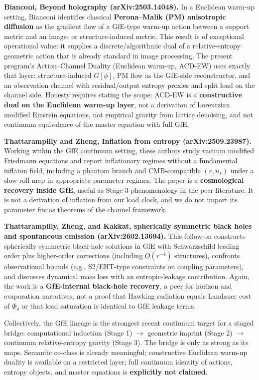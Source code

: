 \documentclass[
  11pt,
]{article}
\begin{document}
\textbf{Bianconi, Beyond holography (arXiv:2503.14048).} In a Euclidean
warm-up setting, Bianconi identifies classical \textbf{Perona--Malik
(PM) anisotropic diffusion} as the gradient flow of a GfE-type warm-up
action between a support metric and an image- or structure-induced
metric. This result is of exceptional operational value: it supplies a
discrete/algorithmic dual of a relative-entropy geometric action that is
already standard in image processing. The present program's
Action--Channel Duality (Euclidean warm-up, ACD-EW) uses exactly that
layer: structure-induced \(G[\phi]\), PM flow as the GfE-side
reconstructor, and an observation channel with residual/output entropy
proxies and split load on the channel side. Honesty requires stating the
scope: ACD-EW is a \textbf{constructive dual on the Euclidean warm-up
layer}, not a derivation of Lorentzian modified Einstein equations, not
empirical gravity from lattice denoising, and not continuum equivalence
of the master equation with full GfE.

\textbf{Thattarampilly and Zheng, Inflation from entropy
(arXiv:2509.23987).} Working within the GfE continuum setting, these
authors study vacuum modified Friedmann equations and report
inflationary regimes without a fundamental inflaton field, including a
phantom branch and CMB-compatible \((r,n_s)\) under a slow-roll map in
appropriate parameter regimes. The paper is a \textbf{cosmological
recovery inside GfE}, useful as Stage-3 phenomenology in the peer
literature. It is not a derivation of inflation from our load clock, and
we do not import its parameter fits as theorems of the channel
framework.

\textbf{Thattarampilly, Zheng, and Kakkat, spherically symmetric black
holes and spontaneous emission (arXiv:2602.13694).} This follow-on
constructs spherically symmetric black-hole solutions in GfE with
Schwarzschild leading order plus higher-order corrections (including
\(O(r^{-4})\) structures), confronts observational bounds (e.g.,
S2/EHT-type constraints on coupling parameters), and discusses dynamical
mass loss with an entropic-leakage contribution. Again, the work is a
\textbf{GfE-internal black-hole recovery}, a peer for horizon and
evaporation narratives, not a proof that Hawking radiation equals
Landauer cost of \(\Phi_g\) or that load saturation is identical to GfE
leakage terms.

Collectively, the GfE lineage is the strongest recent continuum target
for a staged bridge: computational induction (Stage 1) \(\to\) geometric
imprint (Stage 2) \(\to\) continuum relative-entropy gravity (Stage 3).
The bridge is only as strong as its maps. Semantic co-class is already
meaningful; constructive Euclidean warm-up duality is available on a
restricted layer; full continuum identity of actions, entropy objects,
and master equations is \textbf{explicitly not claimed}.
\end{document}
